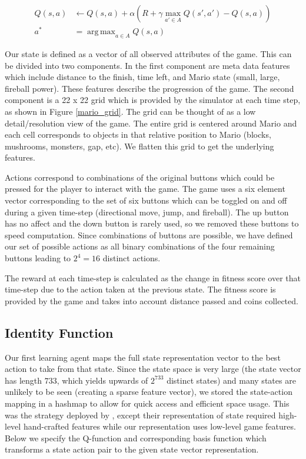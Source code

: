 \documentclass[12pt]{article}
\DeclareMathOperator*{\argmax}{arg\,max}
\begin{document}
\begin{align*}
Q(s,a) &\leftarrow Q(s,a) + \alpha (R + \gamma \max_{a' \in A} Q(s',a') - Q(s,a))\\
a^* &= \argmax_{a \in A} Q(s,a)
\end{align*}

Our state is defined as a vector of all observed attributes of the game. This can be divided into two components. In the first component are meta data features which include distance to the finish, time left, and Mario state (small, large, fireball power). These features describe the progression of the game. The second component is a 22 x 22 grid which is provided by the simulator at each time step, as shown in Figure \ref{mario_grid}. The grid can be thought of as a low detail/resolution view of the game. The entire grid is centered around Mario and each cell corresponds to objects in that relative position to Mario (blocks, mushrooms, monsters, gap, etc). We flatten this grid to get the underlying features.

Actions correspond to combinations of the original buttons which could be pressed for the player to interact with the game. The game uses a six element vector corresponding to the set of six buttons which can be toggled on and off during a given time-step (directional move, jump, and fireball). The up button has no affect and the down button is rarely used, so we removed these buttons to speed computation. Since combinations of buttons are possible, we have defined our set of possible actions as all binary combinations of the four remaining buttons leading to $2^4 = 16$ distinct actions.

The reward at each time-step is calculated as the change in fitness score over that time-step due to the action taken at the previous state. The fitness score is provided by the game and takes into account distance passed and coins collected.

\subsection{Identity Function}

Our first learning agent maps the full state representation vector to the best action to take from that state. Since the state space is very large (the state vector has length $733$, which yields upwards of $2^{733}$ distinct states) and many states are unlikely to be seen (creating a sparse feature vector), we stored the state-action mapping in a hashmap to allow for quick access and efficient space usage. This was the strategy deployed by \cite{liao2012cs229}, except their representation of state required high-level hand-crafted features while our representation uses low-level game features. Below we specify the Q-function and corresponding basis function which transforms a state action pair to the given state vector representation.
\end{document}
